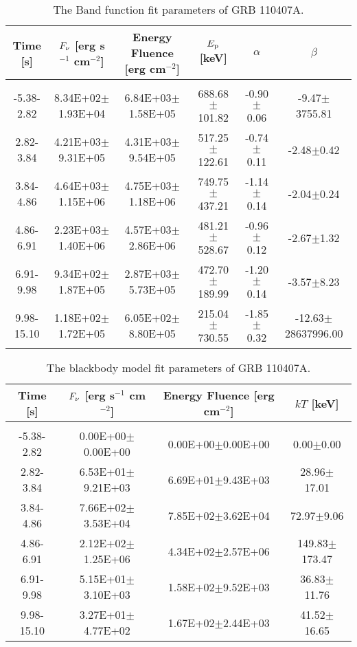 \begin{table}[h]
\centering
\scriptsize
\label{tab:}
\begin{tabular}{c| c c c c c}
Time [s] & $F_{\nu}$ [erg s$^{-1}$ cm$^{-2}$] & Energy Fluence [erg cm$^{-2}$] & $E_{\rm p}$ [keV] & $\alpha$ & $\beta$ \\
\hline \hline\\ 

-5.38-2.82 & 8.34E+02$\pm$1.93E+04 & 6.84E+03$\pm$1.58E+05 & 688.68$\pm$101.82 & -0.90$\pm$0.06 & -9.47$\pm$3755.81 \\ 

2.82-3.84 & 4.21E+03$\pm$9.31E+05 & 4.31E+03$\pm$9.54E+05 & 517.25$\pm$122.61 & -0.74$\pm$0.11 & -2.48$\pm$0.42 \\ 

3.84-4.86 & 4.64E+03$\pm$1.15E+06 & 4.75E+03$\pm$1.18E+06 & 749.75$\pm$437.21 & -1.14$\pm$0.14 & -2.04$\pm$0.24 \\ 

4.86-6.91 & 2.23E+03$\pm$1.40E+06 & 4.57E+03$\pm$2.86E+06 & 481.21$\pm$528.67 & -0.96$\pm$0.12 & -2.67$\pm$1.32 \\ 

6.91-9.98 & 9.34E+02$\pm$1.87E+05 & 2.87E+03$\pm$5.73E+05 & 472.70$\pm$189.99 & -1.20$\pm$0.14 & -3.57$\pm$8.23 \\ 

9.98-15.10 & 1.18E+02$\pm$1.72E+05 & 6.05E+02$\pm$8.80E+05 & 215.04$\pm$730.55 & -1.85$\pm$0.32 & -12.63$\pm$28637996.00 \\ 

\end{tabular}
\caption{The Band function fit parameters of GRB 110407A.}
\end{table}

\begin{table}[h]
\centering
\scriptsize
\label{tab:}
\begin{tabular}{c| c c c}
Time [s] & $F_{\nu}$ [erg s$^{-1}$ cm$^{-2}$] & Energy Fluence [erg cm$^{-2}$] & $kT$ [keV] \\
\hline \hline\\ 

-5.38-2.82 & 0.00E+00$\pm$0.00E+00 & 0.00E+00$\pm$0.00E+00 & 0.00$\pm$0.00 \\ 

2.82-3.84 & 6.53E+01$\pm$9.21E+03 & 6.69E+01$\pm$9.43E+03 & 28.96$\pm$17.01 \\ 

3.84-4.86 & 7.66E+02$\pm$3.53E+04 & 7.85E+02$\pm$3.62E+04 & 72.97$\pm$9.06 \\ 

4.86-6.91 & 2.12E+02$\pm$1.25E+06 & 4.34E+02$\pm$2.57E+06 & 149.83$\pm$173.47 \\ 

6.91-9.98 & 5.15E+01$\pm$3.10E+03 & 1.58E+02$\pm$9.52E+03 & 36.83$\pm$11.76 \\ 

9.98-15.10 & 3.27E+01$\pm$4.77E+02 & 1.67E+02$\pm$2.44E+03 & 41.52$\pm$16.65 \\ 

\end{tabular}
\caption{The blackbody model fit parameters of GRB 110407A.}
\end{table}

